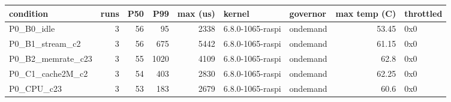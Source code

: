 \begin{tabular}{lrrrrllrl}
\toprule
condition & runs & P50 & P99 & max (us) & kernel & governor & max temp (C) & throttled \\
\midrule
P0\_B0\_idle & 3 & 56 & 95 & 2338 & 6.8.0-1065-raspi & ondemand & 53.45 & 0x0 \\
P0\_B1\_stream\_c2 & 3 & 56 & 675 & 5442 & 6.8.0-1065-raspi & ondemand & 61.15 & 0x0 \\
P0\_B2\_memrate\_c23 & 3 & 55 & 1020 & 4109 & 6.8.0-1065-raspi & ondemand & 62.8 & 0x0 \\
P0\_C1\_cache2M\_c2 & 3 & 54 & 403 & 2830 & 6.8.0-1065-raspi & ondemand & 62.25 & 0x0 \\
P0\_CPU\_c23 & 3 & 53 & 183 & 2679 & 6.8.0-1065-raspi & ondemand & 60.6 & 0x0 \\
\bottomrule
\end{tabular}

